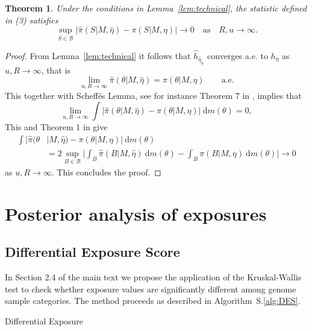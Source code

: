 \documentclass[11pt]{amsart}
\makeatletter
\def\BState{\State\hskip-\ALG@thistlm}
\newtheorem{theorem}{Theorem}
\theoremstyle{definition}
\makeatother
\begin{document}
\begin{theorem} Under the conditions in Lemma~\ref{lem:technical},
  the statistic defined in \textup{(3)} satisfies
\[
  \sup_{S \in  \mathcal B}
     \big|
         \hat\pi(S|M, \hat\eta) -  \pi(S|M, \eta)
     \big| \to 0 \quad \text{as}\quad R, u \to \infty.
\]
\end{theorem}
\begin{proof}
From Lemma~\ref{lem:technical} it follows that $\widehat
h_{\hat\eta_u}$ converges a.e. to $h_\eta$ as $u, R \to \infty$, that
is
\[
  \lim_{u, R \to \infty} \widehat\pi(\theta|M, \hat\eta)
  =
  \pi(\theta|M,\eta)\qquad\text{a.e.}
\]
This together with Scheff\'es Lemma, see for instance Theorem 7 in
\cite{DG}, implies that
\[
  \lim_{u, R \to \infty}
  \int \big|\widehat\pi(\theta|M, \hat\eta) - \pi(\theta|M,
  \eta)\big|\ \text{d}m(\theta)
  =
  0,
\]
This and Theorem 1 in \cite{DG} give
\begin{align*}
  \int \big|\widehat\pi(\theta &| M, \hat\eta)
   -
  \pi(\theta|M, \eta)\big|\ \text{d}m(\theta)                \\
  &=
  2 \sup_{B \in \mathcal B}\Bigg|
      \int_B \widehat\pi(B|M, \hat\eta)\ \text{d}m(\theta)
      -
      \int_B \pi(B|M, \eta)\ \text{d}m(\theta)
   \Big| \to 0
\end{align*}
as $u, R \to \infty$. This concludes the proof.
\end{proof}

\section{Posterior analysis of exposures}
\subsection{Differential Exposure Score}
In Section 2.4 of the main text we propose the application of the
Kruskal-Wallis test to check whether exposure values are
significantly different among genome sample categories.  The method
proceeds as described in Algorithm~S.\ref{alg:DES}.

\begin{algorithm}
\caption{Differential Exposure}\label{alg:DES}
\end{algorithm}
\end{document}
